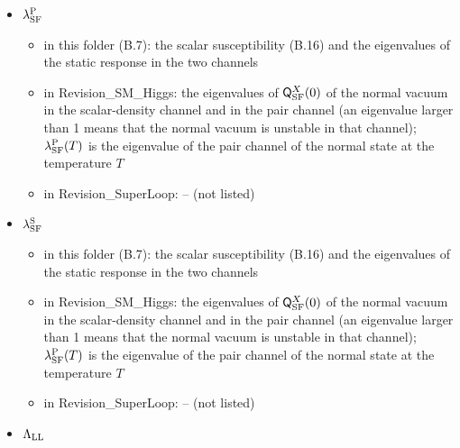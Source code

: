 \documentclass[
  10pt,
]{article}
\providecommand{\tightlist}{%
  \setlength{\itemsep}{0pt}\setlength{\parskip}{0pt}}
\begin{document}
\begin{itemize}
  \begin{itemize}
  \tightlist
  \item
    in this folder (A.7): the Fermi momentum
  \item
    in Revision\_SM\_Higgs: -- (not listed)
  \item
    in Revision\_SuperLoop: the Fermi momentum
    \((\mu_{\rm LL}^2-m_{\rm LL}^2)^{1/2}\) and the density of states of
    one species and one spin state at the Fermi surface,
    \(\nu^{\rm F}_{\rm LL}=k^{\rm F}_{\rm LL}\mu_{\rm LL}/(2\pi^2)\)
  \end{itemize}
\item
  \(\lambda^{\rm P}_{\rm SF}\)

  \begin{itemize}
  \tightlist
  \item
    in this folder (B.7): the scalar susceptibility (B.16) and the
    eigenvalues of the static response in the two channels
  \item
    in Revision\_SM\_Higgs: the eigenvalues of
    \(\mathsf Q^X_{\rm SF}(0)\) of the normal vacuum in the
    scalar-density channel and in the pair channel (an eigenvalue larger
    than 1 means that the normal vacuum is unstable in that channel);
    \(\lambda^{\rm P}_{\rm SF}(T)\) is the eigenvalue of the pair
    channel of the normal state at the temperature \(T\)
  \item
    in Revision\_SuperLoop: -- (not listed)
  \end{itemize}
\item
  \(\lambda^{\rm S}_{\rm SF}\)

  \begin{itemize}
  \tightlist
  \item
    in this folder (B.7): the scalar susceptibility (B.16) and the
    eigenvalues of the static response in the two channels
  \item
    in Revision\_SM\_Higgs: the eigenvalues of
    \(\mathsf Q^X_{\rm SF}(0)\) of the normal vacuum in the
    scalar-density channel and in the pair channel (an eigenvalue larger
    than 1 means that the normal vacuum is unstable in that channel);
    \(\lambda^{\rm P}_{\rm SF}(T)\) is the eigenvalue of the pair
    channel of the normal state at the temperature \(T\)
  \item
    in Revision\_SuperLoop: -- (not listed)
  \end{itemize}
\item
  \(\Lambda_{\rm LL}\)


\end{itemize}
\end{document}

